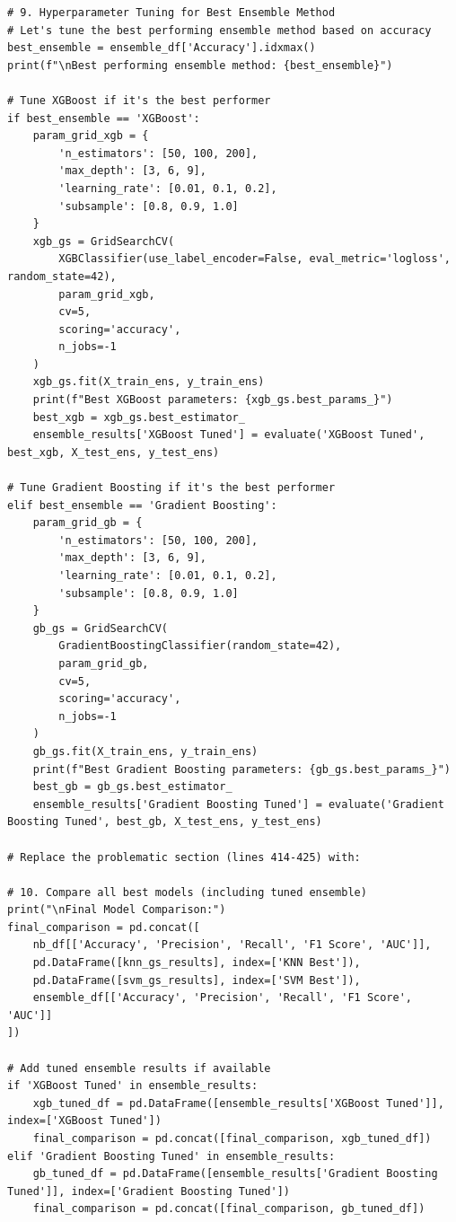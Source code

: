 \documentclass[12pt]{article}
\begin{document}
\begin{verbatim}
# 9. Hyperparameter Tuning for Best Ensemble Method
# Let's tune the best performing ensemble method based on accuracy
best_ensemble = ensemble_df['Accuracy'].idxmax()
print(f"\nBest performing ensemble method: {best_ensemble}")

# Tune XGBoost if it's the best performer
if best_ensemble == 'XGBoost':
    param_grid_xgb = {
        'n_estimators': [50, 100, 200],
        'max_depth': [3, 6, 9],
        'learning_rate': [0.01, 0.1, 0.2],
        'subsample': [0.8, 0.9, 1.0]
    }
    xgb_gs = GridSearchCV(
        XGBClassifier(use_label_encoder=False, eval_metric='logloss', random_state=42),
        param_grid_xgb,
        cv=5,
        scoring='accuracy',
        n_jobs=-1
    )
    xgb_gs.fit(X_train_ens, y_train_ens)
    print(f"Best XGBoost parameters: {xgb_gs.best_params_}")
    best_xgb = xgb_gs.best_estimator_
    ensemble_results['XGBoost Tuned'] = evaluate('XGBoost Tuned', best_xgb, X_test_ens, y_test_ens)

# Tune Gradient Boosting if it's the best performer
elif best_ensemble == 'Gradient Boosting':
    param_grid_gb = {
        'n_estimators': [50, 100, 200],
        'max_depth': [3, 6, 9],
        'learning_rate': [0.01, 0.1, 0.2],
        'subsample': [0.8, 0.9, 1.0]
    }
    gb_gs = GridSearchCV(
        GradientBoostingClassifier(random_state=42),
        param_grid_gb,
        cv=5,
        scoring='accuracy',
        n_jobs=-1
    )
    gb_gs.fit(X_train_ens, y_train_ens)
    print(f"Best Gradient Boosting parameters: {gb_gs.best_params_}")
    best_gb = gb_gs.best_estimator_
    ensemble_results['Gradient Boosting Tuned'] = evaluate('Gradient Boosting Tuned', best_gb, X_test_ens, y_test_ens)

# Replace the problematic section (lines 414-425) with:

# 10. Compare all best models (including tuned ensemble)
print("\nFinal Model Comparison:")
final_comparison = pd.concat([
    nb_df[['Accuracy', 'Precision', 'Recall', 'F1 Score', 'AUC']],
    pd.DataFrame([knn_gs_results], index=['KNN Best']),
    pd.DataFrame([svm_gs_results], index=['SVM Best']),
    ensemble_df[['Accuracy', 'Precision', 'Recall', 'F1 Score', 'AUC']]
])

# Add tuned ensemble results if available
if 'XGBoost Tuned' in ensemble_results:
    xgb_tuned_df = pd.DataFrame([ensemble_results['XGBoost Tuned']], index=['XGBoost Tuned'])
    final_comparison = pd.concat([final_comparison, xgb_tuned_df])
elif 'Gradient Boosting Tuned' in ensemble_results:
    gb_tuned_df = pd.DataFrame([ensemble_results['Gradient Boosting Tuned']], index=['Gradient Boosting Tuned'])
    final_comparison = pd.concat([final_comparison, gb_tuned_df])


\end{verbatim}
\end{document}
